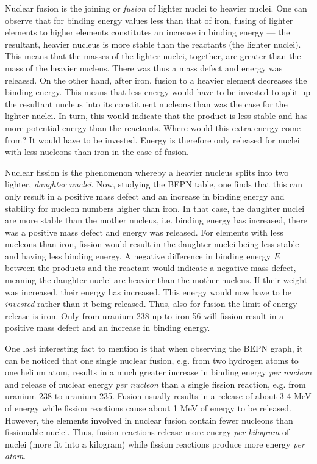 \begin{itemize}
	

	Nuclear fusion is the joining or \emph{fusion} of lighter nuclei to heavier nuclei. One can observe that for binding energy values less than that of iron, fusing of lighter elements to higher elements constitutes an increase in binding energy --- the resultant, heavier nucleus is more stable than the reactants (the lighter nuclei). This means that the masses of the lighter nuclei, together, are greater than the mass of the heavier nucleus. There was thus a mass defect and energy was releaesd. On the other hand, after iron, fusion to a heavier element decreases the binding energy. This means that less energy would have to be invested to split up the resultant nucleus into its constituent nucleons than was the case for the lighter nuclei. In turn, this would indicate that the product is less stable and has more potential energy than the reactants. Where would this extra energy come from? It would have to be invested. Energy is therefore only released for nuclei with less nucleons than iron in the case of fusion.


	Nuclear fission is the phenomenon whereby a heavier nucleus splits into two lighter, \emph{daughter nuclei}. Now, studying the BEPN table, one finds that this can only result in a positive mass defect and an increase in binding energy and stability for nucleon numbers higher than iron. In that case, the daughter nuclei are more stable than the mother nucleus, i.e. binding energy has increased, there was a positive mass defect and energy was released. For elements with less nucleons than iron, fission would result in the daughter nuclei being less stable and having less binding energy. A negative difference in binding energy $E$ between the products and the reactant would indicate a negative mass defect, meaning the daughter nuclei are heavier than the mother nucleus. If their weight was increased, their energy has increased. This energy would now have to be \emph{invested} rather than it being released. Thus, also for fusion the limit of energy release is iron. Only from uranium-238 up to iron-56 will fission result in a positive mass defect and an increase in binding energy.

\end{itemize}

One last interesting fact to mention is that when observing the BEPN graph, it can be noticed that one single nuclear fusion, e.g. from two hydrogen atoms to one helium atom, results in a much greater increase in binding energy \emph{per nucleon} and release of nuclear energy \emph{per nucleon} than a single fission reaction, e.g. from uranium-238 to uranium-235. Fusion usually results in a release of about 3-4 MeV of energy while fission reactions cause about 1 MeV of energy to be released. However, the elements involved in nuclear fusion contain fewer nucleons than fissionable nuclei. Thus, fusion reactions release more energy \emph{per kilogram} of nuclei (more fit into a kilogram) while fission reactions produce more energy \emph{per atom}.


